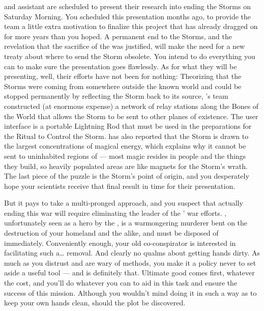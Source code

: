 \documentclass[char]{GL2020}
\begin{document}
 \cHeadScientist{\full} and \cHeadScientist{\their} assistant \cAssistantScientist{\full} are scheduled to present their research into ending the Storms on Saturday Morning. You scheduled this presentation months ago, to provide the team a little extra motivation to finalize this project that has already dragged on for more years than you hoped. A permanent end to the Storms, and the revelation that the sacrifice of the \pShip{} was justified, will make the need for a new treaty about where to send the Storm obsolete. You intend to do everything you can to make sure the presentation goes flawlessly. As for what they will be presenting, well, their efforts have not been for nothing: Theorizing that the Storms were coming from somewhere outside the known world and could be stopped permanently by reflecting the Storm back to its source, \cHeadScientist{}’s team constructed (at enormous expense) a network of relay stations along the Bones of the World that allows the Storm to be sent to other planes of existence. The user interface is a portable Lightning Rod that must be used in the preparations for the Ritual to Control the Storm. \cHeadScientist{} has also reported that the Storm is drawn to the largest concentrations of magical energy, which explains why it cannot be sent to uninhabited regions of \pEarth{} — most magic resides in people and the things they build, so heavily populated areas are like magnets for the Storm’s wrath. The last piece of the puzzle is the Storm’s point of origin, and you desperately hope your scientists receive that final result in time for their presentation.

But it pays to take a multi-pronged approach, and you suspect that actually ending this war will require eliminating the leader of the \pShip{}’ war efforts. \cLoud{\full}, unfortunately seen as a hero by the \pShippies{}, is a warmongering murderer bent on the destruction of your homeland and the \pFarm{} alike, and must be disposed of immediately. Conveniently enough, your old co-conspirator \cEvil{} is interested in facilitating such a\ldots{} removal. And \cEvil{\they} clearly \cEvil{\have} no qualms about getting \cEvil{\their} hands dirty. As much as you distrust \cEvil{} and are wary of \cEvil{\their} methods, you make it a policy never to set aside a useful tool — and \cEvil{} is definitely that. Ultimate good comes first, whatever the cost, and you'll do whatever you can to aid \cEvil{} in this task and ensure the success of this mission. Although you wouldn't mind doing it in such a way as to keep your own hands clean, should the plot be discovered.
\end{document}
